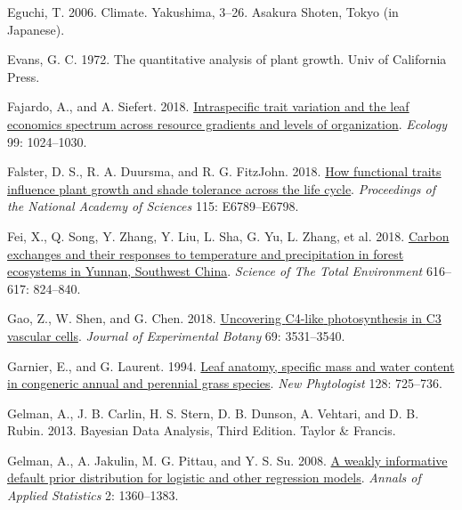 \documentclass[
  12pt,
  a4paper,
,tablecaptionabove
]{scrartcl}
\newlength{\cslhangindent}
\newenvironment{CSLReferences}[2] %
 {%
  \setlength{\parindent}{0pt}
  \ifodd #1 \everypar{\setlength{\hangindent}{\cslhangindent}}\ignorespaces\fi
  \ifnum #2 > 0
  \setlength{\parskip}{#2\baselineskip}
  \fi
 }%
 {}
\begin{document}
\begin{CSLReferences}{1}{0}
\leavevmode{}%
Eguchi, T. 2006. Climate. Yakushima, 3--26. {Asakura Shoten}, {Tokyo (in Japanese)}.

\leavevmode{}%
Evans, G. C. 1972. The quantitative analysis of plant growth. {Univ of California Press}.

\leavevmode{}%
Fajardo, A., and A. Siefert. 2018. \href{https://doi.org/10.1002/ecy.2194}{Intraspecific trait variation and the leaf economics spectrum across resource gradients and levels of organization}. \emph{Ecology} 99: 1024--1030.

\leavevmode{}%
Falster, D. S., R. A. Duursma, and R. G. FitzJohn. 2018. \href{https://doi.org/10.1073/pnas.1714044115}{How functional traits influence plant growth and shade tolerance across the life cycle}. \emph{Proceedings of the National Academy of Sciences} 115: E6789--E6798.

\leavevmode{}%
Fei, X., Q. Song, Y. Zhang, Y. Liu, L. Sha, G. Yu, L. Zhang, et al. 2018. \href{https://doi.org/10.1016/j.scitotenv.2017.10.239}{Carbon exchanges and their responses to temperature and precipitation in forest ecosystems in {Yunnan}, {Southwest China}}. \emph{Science of The Total Environment} 616--617: 824--840.

\leavevmode{}%
Gao, Z., W. Shen, and G. Chen. 2018. \href{https://doi.org/10.1093/jxb/ery155}{Uncovering {C4-like} photosynthesis in {C3} vascular cells}. \emph{Journal of Experimental Botany} 69: 3531--3540.

\leavevmode{}%
Garnier, E., and G. Laurent. 1994. \href{https://doi.org/10.1111/j.1469-8137.1994.tb04036.x}{Leaf anatomy, specific mass and water content in congeneric annual and perennial grass species}. \emph{New Phytologist} 128: 725--736.

\leavevmode{}%
Gelman, A., J. B. Carlin, H. S. Stern, D. B. Dunson, A. Vehtari, and D. B. Rubin. 2013. Bayesian {Data Analysis}, {Third Edition}. {Taylor \& Francis}.

\leavevmode{}%
Gelman, A., A. Jakulin, M. G. Pittau, and Y. S. Su. 2008. \href{https://doi.org/10.1214/08-AOAS191}{A weakly informative default prior distribution for logistic and other regression models}. \emph{Annals of Applied Statistics} 2: 1360--1383.


\end{CSLReferences}
\end{document}
